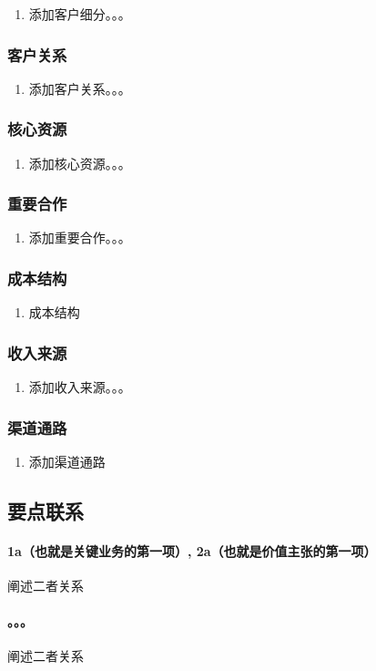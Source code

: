 \documentclass[a4paper]{ctexart}
\begin{document}
\begin{enumerate}[label=\alph*.]
  \item 添加客户细分。。。
\end{enumerate}

\subsubsection{客户关系}

\begin{enumerate}[label=\alph*.]
  \item 添加客户关系。。。
\end{enumerate}

\subsubsection{核心资源}

\begin{enumerate}[label=\alph*.]
  \item 添加核心资源。。。
\end{enumerate}

\subsubsection{重要合作}

\begin{enumerate}[label=\alph*.]
  \item 添加重要合作。。。
\end{enumerate}

\subsubsection{成本结构}

\begin{enumerate}[label=\alph*.]
  \item 成本结构
\end{enumerate}

\subsubsection{收入来源}

\begin{enumerate}[label=\alph*.]
  \item 添加收入来源。。。
\end{enumerate}

\subsubsection{渠道通路}

\begin{enumerate}[label=\alph*.]
  \item 添加渠道通路
\end{enumerate}


\subsection{要点联系}

\paragraph{1a（也就是关键业务的第一项）, 2a（也就是价值主张的第一项）}阐述二者关系
\paragraph{。。。}阐述二者关系
\end{document}
